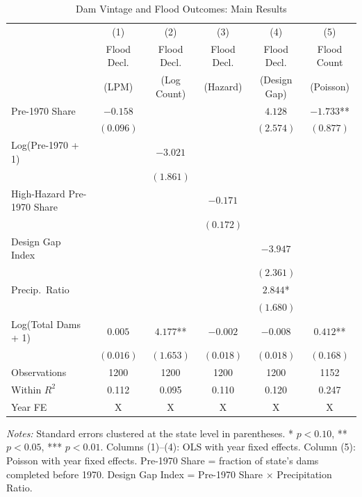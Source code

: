 \begin{table}[htbp]
\centering
\caption{Dam Vintage and Flood Outcomes: Main Results}
\label{tab:main}
\begin{threeparttable}
\footnotesize
\begin{tabular}{lccccc}
\toprule
 & (1) & (2) & (3) & (4) & (5) \\
 & Flood Decl. & Flood Decl. & Flood Decl. & Flood Decl. & Flood Count \\
 & (LPM) & (Log Count) & (Hazard) & (Design Gap) & (Poisson) \\
\midrule
Pre-1970 Share        & $-0.158$   &            &            & $4.128$     & $-1.733$** \\
                      & $(0.096)$  &            &            & $(2.574)$   & $(0.877)$  \\[4pt]
Log(Pre-1970 + 1)     &            & $-3.021$   &            &             &            \\
                      &            & $(1.861)$  &            &             &            \\[4pt]
High-Hazard Pre-1970 Share &       &            & $-0.171$   &             &            \\
                      &            &            & $(0.172)$  &             &            \\[4pt]
Design Gap Index      &            &            &            & $-3.947$    &            \\
                      &            &            &            & $(2.361)$   &            \\[4pt]
Precip.\ Ratio        &            &            &            & $2.844$*    &            \\
                      &            &            &            & $(1.680)$   &            \\[4pt]
Log(Total Dams + 1)   & $0.005$    & $4.177$**  & $-0.002$   & $-0.008$    & $0.412$**  \\
                      & $(0.016)$  & $(1.653)$  & $(0.018)$  & $(0.018)$   & $(0.168)$  \\
\midrule
Observations          & 1200       & 1200       & 1200       & 1200        & 1152       \\
Within $R^2$          & 0.112      & 0.095      & 0.110      & 0.120       & 0.247      \\
Year FE               & X          & X          & X          & X           & X          \\
\bottomrule
\end{tabular}
\begin{tablenotes}[flushleft]
\footnotesize
\item \textit{Notes:} Standard errors clustered at the state level in parentheses. * $p<0.10$, ** $p<0.05$, *** $p<0.01$. Columns (1)--(4): OLS with year fixed effects. Column (5): Poisson with year fixed effects. Pre-1970 Share = fraction of state's dams completed before 1970. Design Gap Index = Pre-1970 Share $\times$ Precipitation Ratio.
\end{tablenotes}
\end{threeparttable}
\end{table}
